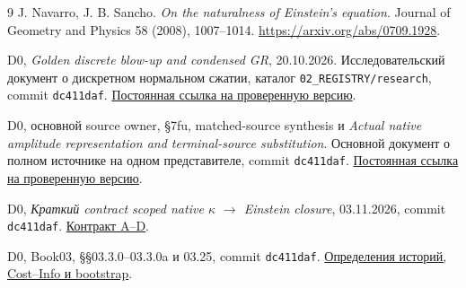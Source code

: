 \documentclass[11pt,a4paper]{article}
\begin{document}
\begin{thebibliography}{9}
J. Navarro, J. B. Sancho.
\emph{On the naturalness of Einstein's equation}.
Journal of Geometry and Physics 58 (2008), 1007--1014.
\url{https://arxiv.org/abs/0709.1928}.

D0, \emph{Golden discrete blow-up and condensed GR}, 20.10.2026.
Исследовательский документ о дискретном нормальном сжатии,
каталог \texttt{02\_REGISTRY/research}, commit \texttt{dc411daf}.
\href{https://github.com/gvakhrushev/d0_15/blob/dc411daf01f697ec85dd22f28bfe124171796645/02_REGISTRY/research/A4D_GOLDEN_DISCRETE_BLOWUP_CONDENSED_GR_2026_10_20.md}{Постоянная ссылка на проверенную версию}.

D0, основной source owner, \S7fu, matched-source synthesis и
\emph{Actual native amplitude representation and terminal-source substitution}.
Основной документ о полном источнике на одном представителе,
commit \texttt{dc411daf}.
\href{https://github.com/gvakhrushev/d0_15/blob/dc411daf01f697ec85dd22f28bfe124171796645/02_REGISTRY/research/A4D_NONVACUUM_SAME_REPRESENTATIVE_PAID_SOURCE_RESIDUAL_2026_10_20.md}{Постоянная ссылка на проверенную версию}.

D0, \emph{Краткий contract scoped native $\kappa$ $\to$ Einstein closure},
03.11.2026, commit \texttt{dc411daf}.
\href{https://github.com/gvakhrushev/d0_15/blob/dc411daf01f697ec85dd22f28bfe124171796645/02_REGISTRY/research/A4D_SCOPED_NATIVE_KAPPA_CONTRACT_2026_11_03.md}{Контракт A--D}.

D0, Book03, \S\S03.3.0--03.3.0a и 03.25,
commit \texttt{dc411daf}.
\href{https://github.com/gvakhrushev/d0_15/blob/dc411daf01f697ec85dd22f28bfe124171796645/01_BOOKS/BOOK_03_FINITE_ACTION_OPERATORS_AND_SCENE_DYNAMICS.md}{Определения историй, Cost--Info и bootstrap}.
\end{thebibliography}
\end{document}
